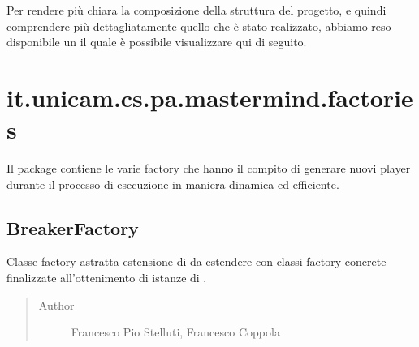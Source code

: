 \documentclass[letterpaper,10pt,italian,openany,oneside]{sphinxmanual}
\begin{document}
Per rendere più chiara la composizione della struttura del progetto, e quindi comprendere più dettagliatamente quello
che è stato realizzato, abbiamo reso disponibile un  il quale è possibile visualizzare qui di seguito.

\noindent{}


\section{it.unicam.cs.pa.mastermind.factories}
\label{\detokenize{source/it/unicam/cs/pa/mastermind/factories/package-index:it-unicam-cs-pa-mastermind-factories}}\label{\detokenize{source/it/unicam/cs/pa/mastermind/factories/package-index::doc}}
Il package contiene le varie factory che hanno il compito di generare nuovi player durante il processo di esecuzione in maniera dinamica ed efficiente.

\label{\detokenize{source/it/unicam/cs/pa/mastermind/factories/package-index:package-it.unicam.cs.pa.mastermind.factories}}

\subsection{BreakerFactory}
\label{\detokenize{source/it/unicam/cs/pa/mastermind/factories/BreakerFactory:breakerfactory}}\label{\detokenize{source/it/unicam/cs/pa/mastermind/factories/BreakerFactory::doc}}

\begin{fulllineitems}
\label{\detokenize{source/it/unicam/cs/pa/mastermind/factories/BreakerFactory:it.unicam.cs.pa.mastermind.factories.BreakerFactory}}
Classe factory astratta estensione di  da estendere con classi factory concrete finalizzate all’ottenimento di istanze di .
\begin{quote}\begin{description}
\item[{Author}] \leavevmode
Francesco Pio Stelluti, Francesco Coppola

\end{description}\end{quote}

\end{fulllineitems}
\end{document}
